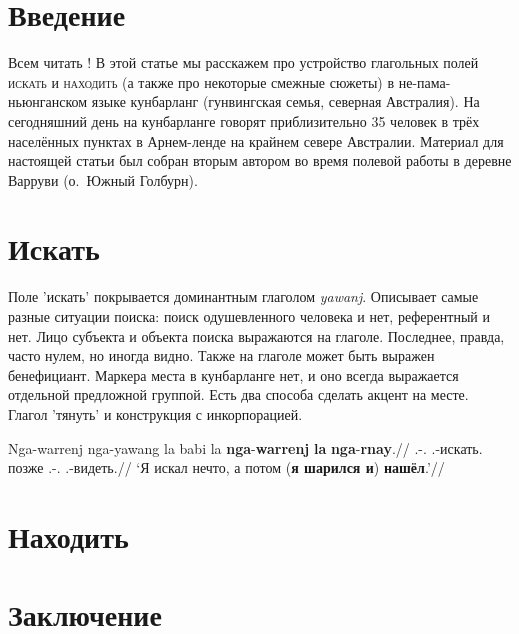 \section{Введение}
Всем читать \cite{ik16bun}!
В этой статье мы расскажем про устройство глагольных полей \textsc{искать} и \textsc{находить} (а также про некоторые смежные сюжеты) в не-пама-ньюнганском языке кунбарланг (гунвингская семья, северная Австралия). На сегодняшний день на кунбарланге говорят приблизительно 35 человек в трёх населённых пунктах в Арнем-ленде на крайнем севере Австралии. Материал для настоящей статьи был собран вторым автором во время полевой работы в деревне Варруви (о.\ Южный Голбурн). %



\section{Искать}
    Поле 'искать' покрывается доминантным глаголом \textit{yawanj}. Описывает самые разные ситуации поиска: поиск одушевленного человека и нет, референтный и нет. Лицо субъекта и объекта поиска выражаются на глаголе. Последнее, правда, часто нулем, но иногда видно. Также на глаголе может быть выражен бенефициант. Маркера места в кунбарланге нет, и оно всегда выражается отдельной предложной группой. 
    Есть два способа сделать акцент на месте. Глагол 'тянуть' и конструкция с инкорпорацией.

\begingl
\gla Nga-warrenj nga-yawang la babi la \textbf{nga}-\textbf{warrenj} \textbf{la} \textbf{nga}-\textbf{rnay}.//
\glb \Fsg.\Real-\warre.\Pst{} \Fsg.\Real-искать.\Pst{} \la{} позже \la{} \Fsg.\Real-\warre.\Pst{} \la{} \Fsg.\Real-видеть.\Pst{}//
\glft `Я искал нечто, а потом (\textbf{я шарился и}) \textbf{ нашёл}.'\trailingcitation{[IK1-170610\_1SY-02/54:02--10]}//
\endgl\xe

\section{Находить}

\section{Заключение}

